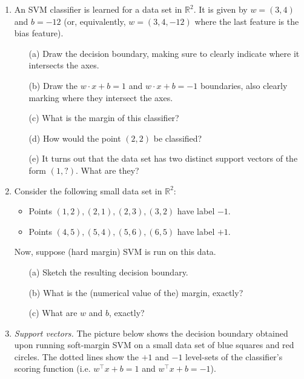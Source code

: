 \documentclass[10pt]{report}
\def\R{{\mathbb R}}
\def\R{{\mathbb R}}
\begin{document}
\begin{enumerate}

\item An SVM classifier is learned for a data set in $\R^2$. It is given by $w = (3,4)$ and $b = -12$ (or, equivalently, $w = (3,4,-12)$ where the last feature is the bias feature). 
\begin{enumerate}
\item[(a)] Draw the decision boundary, making sure to clearly indicate where it intersects the axes.
\item[(b)] Draw the $w \cdot x + b = 1$ and $w \cdot x + b = -1$ boundaries, also clearly marking where they intersect the axes.
\item[(c)] What is the margin of this classifier?
\item[(d)] How would the point $(2,2)$ be classified?
\item[(e)] It turns out that the data set has two distinct support vectors of the form $(1,?)$. What are they?
\end{enumerate}
\begin{solution}

\end{solution}

\item Consider the following small data set in $\R^2$:
\begin{itemize}
\item Points $(1,2), (2,1), (2,3), (3,2)$ have label $-1$.
\item Points $(4,5), (5,4), (5,6), (6,5)$ have label $+1$.
\end{itemize}
Now, suppose (hard margin) SVM is run on this data.
\begin{enumerate}
\item[(a)] Sketch the resulting decision boundary.
\item[(b)] What is the (numerical value of the) margin, exactly?
\item[(c)] What are $w$ and $b$, exactly? 
\end{enumerate}
\begin{solution}
\end{solution}

\item {\it Support vectors.} The picture below shows the decision boundary obtained upon running soft-margin SVM on a small data set of blue squares and red circles. The dotted lines show the $+1$ and $-1$ level-sets of the classifier's scoring function (i.e. $w^\top x + b = 1$ and $w^\top x + b = -1$).


\end{enumerate}
\end{document}
